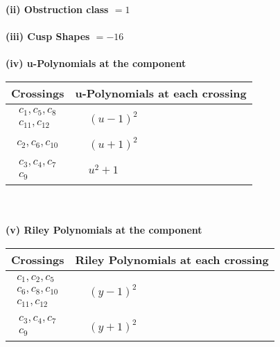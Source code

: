 \documentclass[1p]{elsarticle_modified}
\theoremstyle{definition}
\begin{document}
\flushleft \textbf{(ii) Obstruction class $= 1$}\\~\\
\flushleft \textbf{(iii) Cusp Shapes $= -16$}\\~\\
\newpage\renewcommand{\arraystretch}{1}
\flushleft \textbf{(iv) u-Polynomials at the component}\newline \\
\begin{tabular}{m{50pt}|m{274pt}}
Crossings & \hspace{64pt}u-Polynomials at each crossing \\
\hline $$\begin{aligned}c_{1},c_{5},c_{8}\\c_{11},c_{12}\end{aligned}$$&$\begin{aligned}
&(u-1)^2
\end{aligned}$\\
\hline $$\begin{aligned}c_{2},c_{6},c_{10}\end{aligned}$$&$\begin{aligned}
&(u+1)^2
\end{aligned}$\\
\hline $$\begin{aligned}c_{3},c_{4},c_{7}\\c_{9}\end{aligned}$$&$\begin{aligned}
&u^2+1
\end{aligned}$\\
\hline
\end{tabular}\\~\\
\newpage\renewcommand{\arraystretch}{1}
\flushleft \textbf{(v) Riley Polynomials at the component}\newline \\
\begin{tabular}{m{50pt}|m{274pt}}
Crossings & \hspace{64pt}Riley Polynomials at each crossing \\
\hline $$\begin{aligned}c_{1},c_{2},c_{5}\\c_{6},c_{8},c_{10}\\c_{11},c_{12}\end{aligned}$$&$\begin{aligned}
&(y-1)^2
\end{aligned}$\\
\hline $$\begin{aligned}c_{3},c_{4},c_{7}\\c_{9}\end{aligned}$$&$\begin{aligned}
&(y+1)^2
\end{aligned}$\\
\hline
\end{tabular}\\~\\
\end{document}

